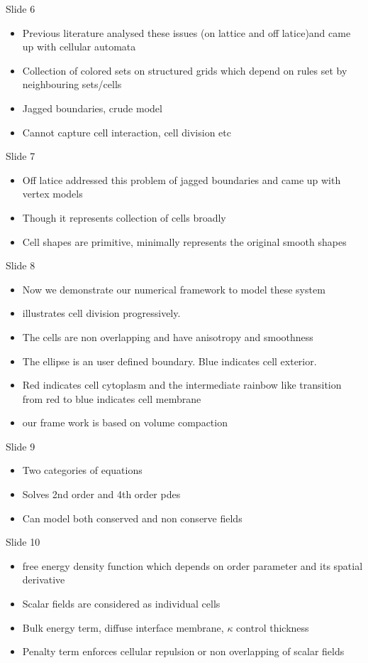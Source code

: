 \documentclass[a4paper,oneside,11pt]{report}
\begin{document}
   Slide 6
   \begin{itemize} 
    \item Previous literature analysed these issues (on lattice and off latice)and came up with cellular automata
    \item Collection of colored sets on structured grids which depend on rules set by neighbouring sets/cells
    \item Jagged boundaries, crude model
    \item Cannot capture cell interaction, cell division etc
    \end{itemize}
   Slide 7
   \begin{itemize}
   	\item Off latice addressed this problem of jagged boundaries and came up with vertex models
   	\item Though it represents collection of cells broadly
   	\item Cell shapes are primitive, minimally represents the original smooth shapes
   \end{itemize}
   Slide 8
   \begin{itemize}
   	\item Now we demonstrate our numerical framework to model these system
   	\item illustrates cell division progressively.
   	\item The cells are non overlapping and have anisotropy and smoothness
   	\item The ellipse is an user defined boundary. Blue indicates cell exterior.
   	\item Red indicates cell cytoplasm and the intermediate rainbow like transition from red to blue indicates cell membrane
   	\item our frame work is based on volume compaction
   \end{itemize}
   Slide 9
   \begin{itemize}
   	\item Two categories of equations
   	\item Solves 2nd order and 4th order pdes
   	\item Can model both conserved and non conserve fields
   \end{itemize}
   Slide 10
   \begin{itemize}
   	\item free energy density function which depends on order parameter and its spatial derivative
   	\item Scalar fields are considered as individual cells
   	\item Bulk energy term, diffuse interface membrane, $\kappa$ control thickness
   	\item Penalty term enforces cellular repulsion or non overlapping of scalar fields
   \end{itemize}
\end{document}
